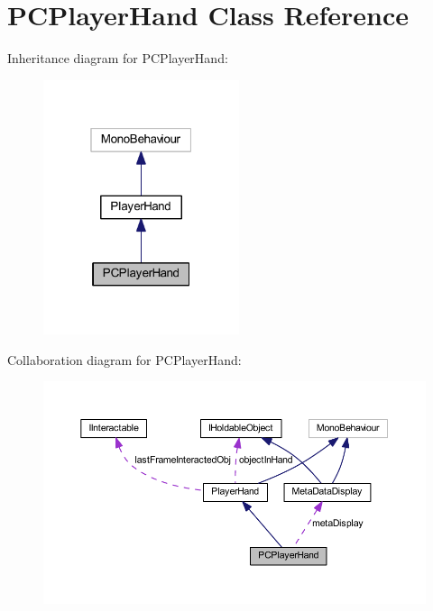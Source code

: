 \hypertarget{class_p_c_player_hand}{}\section{P\+C\+Player\+Hand Class Reference}
\label{class_p_c_player_hand}


Inheritance diagram for P\+C\+Player\+Hand\+:
\nopagebreak
\begin{figure}[H]
\begin{center}
\leavevmode
\includegraphics[width=163pt]{class_p_c_player_hand__inherit__graph}
\end{center}
\end{figure}


Collaboration diagram for P\+C\+Player\+Hand\+:
\nopagebreak
\begin{figure}[H]
\begin{center}
\leavevmode
\includegraphics[width=350pt]{class_p_c_player_hand__coll__graph}
\end{center}
\end{figure}
